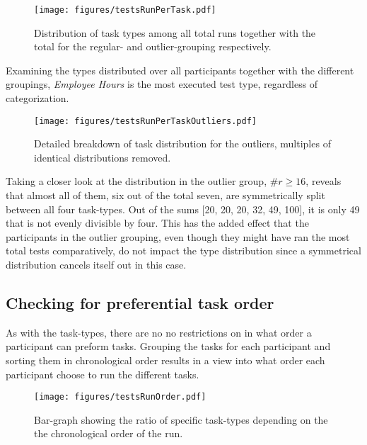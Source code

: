     \begin{figure}[h!]
      \centering
      \texttt{[image: figures/testsRunPerTask.pdf]}
      \caption{
        Distribution of task types among all total runs together with the
        total for the regular- and outlier-grouping respectively.
      }
    \end{figure}

    Examining the types distributed over all participants together
    with the different groupings, \textit{Employee Hours} is the most
    executed test type, regardless of categorization.

    \begin{figure}[h!]
      \centering
      \texttt{[image: figures/testsRunPerTaskOutliers.pdf]}
      \caption{
        Detailed breakdown of task distribution for the outliers, multiples
        of identical distributions removed.
      }
      \label{label_testsRunPerTaskOutliers}
    \end{figure}

    Taking a closer look at the distribution in the outlier group,
    $\#r\geq16$, reveals that almost all of them, six out of the total seven,
    are symmetrically split between all four task-types. Out of the sums
    [20, 20, 20, 32, 49, 100], it is only 49 that is not evenly divisible
    by four. This has the added effect that the participants in the
    outlier grouping, even though they might have ran the most total tests
    comparatively, do not impact the type distribution since a symmetrical
    distribution cancels itself out in this case.

  \subsection{Checking for preferential task order}

    As with the task-types, there are no no restrictions on in what order a
    participant can preform tasks. Grouping the tasks for each participant
    and sorting them in chronological order results in a view into what
    order each participant choose to run the different tasks.

    \begin{figure}[ht!]
      \centering
      \texttt{[image: figures/testsRunOrder.pdf]}
      \caption{
        Bar-graph showing the ratio of specific task-types depending on the
        the chronological order of the run.
      }
      \label{label_testsRunOrder}
    \end{figure}

